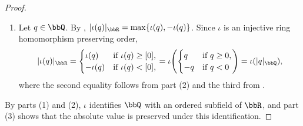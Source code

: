 \begin{proof}
\begin{enumerate}
        \item Let $q \in \bbQ$. By , $|\iota(q)|_\bbR = \max\{\iota(q), -\iota(q)\}$. Since $\iota$ is an injective ring homomorphism preserving order,
        $$|\iota(q)|_\bbR = \begin{cases} \iota(q) & \text{if } \iota(q) \ge [0], \\ -\iota(q) & \text{if } \iota(q) < [0], \end{cases}
        = \iota\!\left(\begin{cases} q & \text{if } q \ge 0, \\ -q & \text{if } q < 0 \end{cases}\right)
        = \iota(|q|_\bbQ),$$
        where the second equality follows from part (2) and the third from .
    \end{enumerate}

    By parts (1) and (2), $\iota$ identifies $\bbQ$ with an ordered subfield of $\bbR$, and part (3) shows that the absolute value is preserved under this identification.
\end{proof}